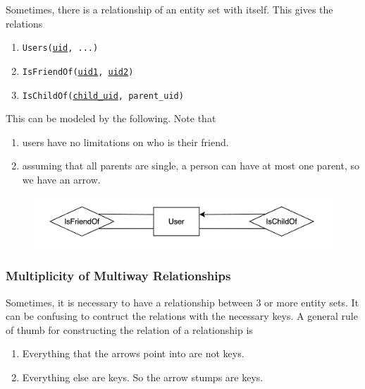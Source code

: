     \begin{example}
      Sometimes, there is a relationship of an entity set with itself. This gives the relations 
      \begin{enumerate}
        \item \texttt{Users(\underline{uid}, ...)} 
        \item \texttt{IsFriendOf(\underline{uid1}, \underline{uid2})} 
        \item \texttt{IsChildOf(\underline{child\_uid}, parent\_uid)}
      \end{enumerate}
      This can be modeled by the following. Note that 
      \begin{enumerate}
        \item users have no limitations on who is their friend. 
        \item assuming that all parents are single, a person can have at most one parent, so we have an arrow.  
      \end{enumerate}
      \begin{figure}[H]
        \centering 
        \includegraphics[scale=0.3]{img/within_itself.png}
        \caption{} 
        \label{fig:within_itself}
      \end{figure}
    \end{example}

  \subsubsection{Multiplicity of Multiway Relationships}

    Sometimes, it is necessary to have a relationship between 3 or more entity sets. It can be confusing to contruct the relations with the necessary keys. A general rule of thumb for constructing the relation of a relationship is 
    \begin{enumerate}
      \item Everything that the arrows point into are not keys.   
      \item Everything else are keys. So the arrow stumps are keys. 
    \end{enumerate}

